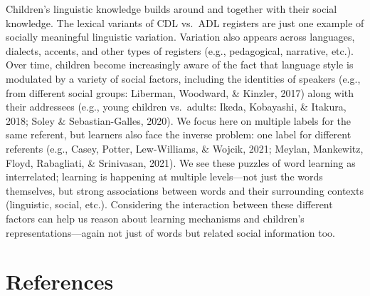 \documentclass[10pt, letterpaper]{article}
\begin{document}
Children's linguistic knowledge builds around and together with their
social knowledge. The lexical variants of CDL vs.~ADL registers are just
one example of socially meaningful linguistic variation. Variation also
appears across languages, dialects, accents, and other types of
registers (e.g., pedagogical, narrative, etc.). Over time, children
become increasingly aware of the fact that language style is modulated
by a variety of social factors, including the identities of speakers
(e.g., from different social groups: Liberman, Woodward, \& Kinzler,
2017) along with their addressees (e.g., young children vs.~adults:
Ikeda, Kobayashi, \& Itakura, 2018; Soley \& Sebastian-Galles, 2020). We
focus here on multiple labels for the same referent, but learners also
face the inverse problem: one label for different referents (e.g.,
Casey, Potter, Lew-Williams, \& Wojcik, 2021; Meylan, Mankewitz, Floyd,
Rabagliati, \& Srinivasan, 2021). We see these puzzles of word learning
as interrelated; learning is happening at multiple levels---not just the
words themselves, but strong associations between words and their
surrounding contexts (linguistic, social, etc.). Considering the
interaction between these different factors can help us reason about
learning mechanisms and children's representations---again not just of
words but related social information too.

\hypertarget{references}{%
\section{References}\label{references}}

\setlength{\parindent}{-0.1in} 
\setlength{\leftskip}{0.125in}

\noindent
\end{document}
